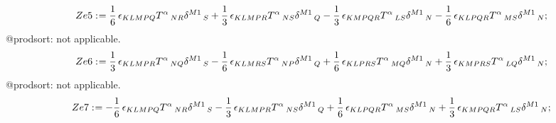 \documentclass[11pt]{article}
\def\specialcolon{\mathrel{\mathop{:}}\hspace{-.5em}}
\begin{document}
\begin{dmath*}[compact, spread=2pt]
Ze5\specialcolon{}= \frac{1}{6}\, {\epsilon}_{K L M P Q} {T}^{\alpha}\,_{N R} {\delta}^{M1}\,_{S} + \frac{1}{3}\, {\epsilon}_{K L M P R} {T}^{\alpha}\,_{N S} {\delta}^{M1}\,_{Q} - \frac{1}{3}\, {\epsilon}_{K M P Q R} {T}^{\alpha}\,_{L S} {\delta}^{M1}\,_{N} - \frac{1}{6}\, {\epsilon}_{K L P Q R} {T}^{\alpha}\,_{M S} {\delta}^{M1}\,_{N};
\end{dmath*}
@prodsort: not applicable.
\begin{dmath*}[compact, spread=2pt]
Ze6\specialcolon{}= \frac{1}{3}\, {\epsilon}_{K L M P R} {T}^{\alpha}\,_{N Q} {\delta}^{M1}\,_{S} - \frac{1}{6}\, {\epsilon}_{K L M R S} {T}^{\alpha}\,_{N P} {\delta}^{M1}\,_{Q} + \frac{1}{6}\, {\epsilon}_{K L P R S} {T}^{\alpha}\,_{M Q} {\delta}^{M1}\,_{N} + \frac{1}{3}\, {\epsilon}_{K M P R S} {T}^{\alpha}\,_{L Q} {\delta}^{M1}\,_{N};
\end{dmath*}
@prodsort: not applicable.
\begin{dmath*}[compact, spread=2pt]
Ze7\specialcolon{}=  - \frac{1}{6}\, {\epsilon}_{K L M P Q} {T}^{\alpha}\,_{N R} {\delta}^{M1}\,_{S} - \frac{1}{3}\, {\epsilon}_{K L M P R} {T}^{\alpha}\,_{N S} {\delta}^{M1}\,_{Q} + \frac{1}{6}\, {\epsilon}_{K L P Q R} {T}^{\alpha}\,_{M S} {\delta}^{M1}\,_{N} + \frac{1}{3}\, {\epsilon}_{K M P Q R} {T}^{\alpha}\,_{L S} {\delta}^{M1}\,_{N};
\end{dmath*}
\end{document}
